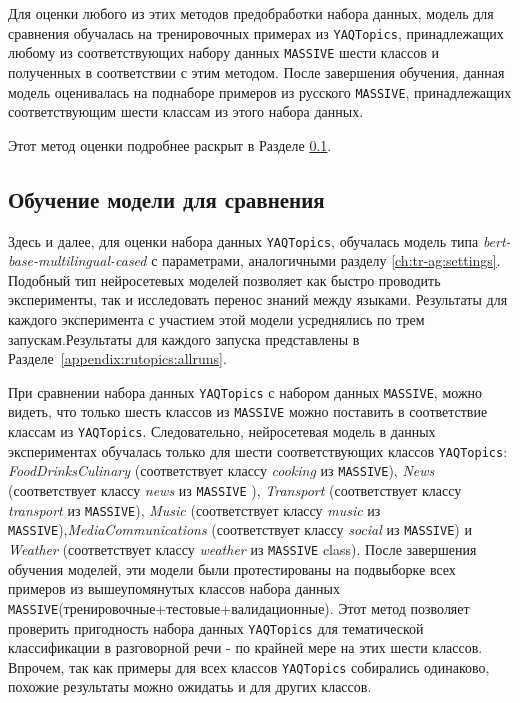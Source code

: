 Для оценки любого из этих методов предобработки набора данных, модель для сравнения обучалась на тренировочных примерах из \texttt{YAQTopics}, принадлежащих любому из соответствующих набору данных \texttt{MASSIVE} шести классов и полученных в соответствии с этим методом. После завершения обучения, данная модель оценивалась на поднаборе примеров из русского \texttt{MASSIVE}, принадлежащих соответствующим шести классам из этого набора данных.

Этот метод оценки подробнее раскрыт в Разделе \ref{comparison_model}.

\subsection{Обучение модели для сравнения}\label{comparison_model}
Здесь и далее, для оценки набора данных \texttt{YAQTopics}, обучалась модель типа \textit{bert-base-multilingual-cased} с параметрами, аналогичными разделу \ref{ch:tr-ag:settings}. Подобный тип нейросетевых моделей позволяет как быстро проводить эксперименты, так и исследовать перенос знаний между языками. Результаты для каждого эксперимента с участием этой модели усреднялись по трем запускам.Результаты для каждого запуска представлены в Разделе~\ref{appendix:rutopics:allruns}.

При сравнении набора данных \texttt{YAQTopics} с набором данных \texttt{MASSIVE}, можно видеть, что только шесть классов из \texttt{MASSIVE} можно поставить в соответствие классам из  \texttt{YAQTopics}. Следовательно, нейросетевая модель в данных экспериментах обучалась только для шести соответствующих классов \texttt{YAQTopics}: \textit{FoodDrinksCulinary} (соответствует классу \textit{cooking} из \texttt{MASSIVE}), \textit{News} (соответствует классу \textit{news} из \texttt{MASSIVE} ), \textit{Transport} (соответствует классу \textit{transport} из \texttt{MASSIVE}), \textit{Music} (соответствует классу \textit{music} из \texttt{MASSIVE}),\textit{MediaCommunications} (соответствует классу \textit{social} из \texttt{MASSIVE}) и \textit{Weather} (соответствует классу \textit{weather} из \texttt{MASSIVE} class). После завершения обучения моделей, эти модели были протестированы на подвыборке всех примеров из вышеупомянутых классов набора данных \texttt{MASSIVE}(тренировочные+тестовые+валидационные). Этот метод позволяет проверить пригодность набора данных \texttt{YAQTopics} для тематической классификации в разговорной речи - по крайней мере на этих шести классов. Впрочем, так как примеры для всех классов \texttt{YAQTopics} собирались одинаково, похожие результаты можно ожидатьь и для других классов.

